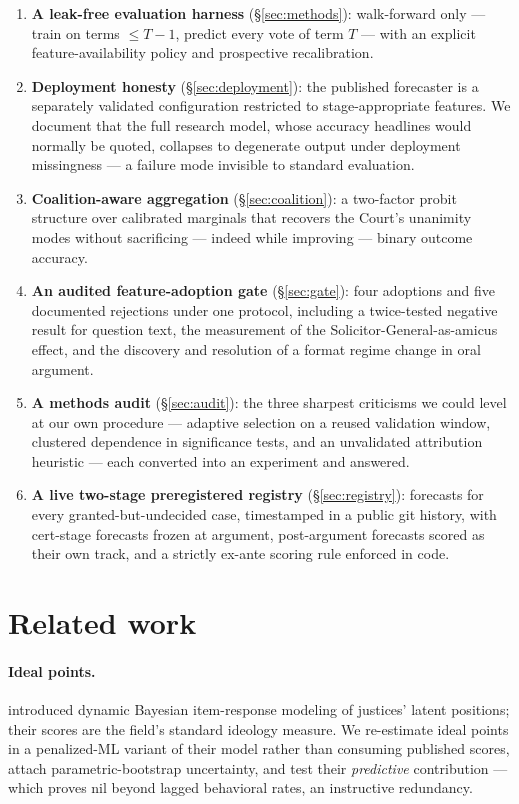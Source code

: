 \documentclass[11pt]{article}
\begin{document}
\begin{enumerate}
\item \textbf{A leak-free evaluation harness} (\S\ref{sec:methods}): walk-forward
  only --- train on terms $\le T{-}1$, predict every vote of term $T$ --- with an
  explicit feature-availability policy and prospective recalibration.
\item \textbf{Deployment honesty} (\S\ref{sec:deployment}): the published
  forecaster is a separately validated configuration restricted to
  stage-appropriate features. We document that the full research model, whose
  accuracy headlines would normally be quoted, collapses to degenerate output
  under deployment missingness --- a failure mode invisible to standard
  evaluation.
\item \textbf{Coalition-aware aggregation} (\S\ref{sec:coalition}): a two-factor
  probit structure over calibrated marginals that recovers the Court's unanimity
  modes without sacrificing --- indeed while improving --- binary outcome accuracy.
\item \textbf{An audited feature-adoption gate} (\S\ref{sec:gate}): four
  adoptions and five documented rejections under one protocol, including a
  twice-tested negative result for question text, the measurement of the
  Solicitor-General-as-amicus effect, and the discovery and resolution of a
  format regime change in oral argument.
\item \textbf{A methods audit} (\S\ref{sec:audit}): the three sharpest
  criticisms we could level at our own procedure --- adaptive selection on a
  reused validation window, clustered dependence in significance tests, and an
  unvalidated attribution heuristic --- each converted into an experiment and
  answered.
\item \textbf{A live two-stage preregistered registry} (\S\ref{sec:registry}):
  forecasts for every granted-but-undecided case, timestamped in a public git
  history, with cert-stage forecasts frozen at argument, post-argument forecasts
  scored as their own track, and a strictly ex-ante scoring rule enforced in code.
\end{enumerate}

\section{Related work}\label{sec:related}

\paragraph{Ideal points.} \citet{martinquinn2002} introduced dynamic Bayesian
item-response modeling of justices' latent positions; their scores are the
field's standard ideology measure. We re-estimate ideal points in a penalized-ML
variant of their model rather than consuming published scores, attach
parametric-bootstrap uncertainty, and test their \emph{predictive} contribution
--- which proves nil beyond lagged behavioral rates, an instructive redundancy.
\end{document}
